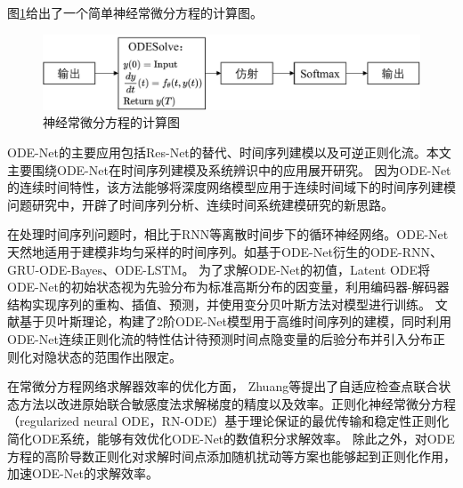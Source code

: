 图\ref{fig:neural_ode}给出了一个简单神经常微分方程的计算图。
\begin{figure}[h]
    \centering
    \includegraphics[width=0.9\linewidth]{figures/chapter1/simple_ode.pdf}
    \caption{神经常微分方程的计算图}
    \label{fig:neural_ode}
\end{figure}

ODE-Net的主要应用包括Res-Net的替代、时间序列建模以及可逆正则化流\cite{Grathwohl2019}。本文主要围绕ODE-Net在时间序列建模及系统辨识中的应用展开研究。
因为ODE-Net的连续时间特性，该方法能够将深度网络模型应用于连续时间域下的时间序列建模问题研究中，开辟了时间序列分析、连续时间系统建模研究的新思路。

在处理时间序列问题时，相比于RNN等离散时间步下的循环神经网络。ODE-Net天然地适用于建模非均匀采样的时间序列。如基于ODE-Net衍生的ODE-RNN\cite{10.5555/3454287.3454765}、GRU-ODE-Bayes\cite{brouwer2019gru}、ODE-LSTM\cite{lechner2020learning}。
为了求解ODE-Net的初值，Latent ODE\cite{10.5555/3454287.3454765}将ODE-Net的初始状态视为先验分布为标准高斯分布的因变量，利用编码器-解码器结构实现序列的重构、插值、预测，并使用变分贝叶斯方法对模型进行训练。
文献\cite{Yildiz2019}基于贝叶斯理论，构建了2阶ODE-Net模型用于高维时间序列的建模，同时利用ODE-Net连续正则化流的特性估计待预测时间点隐变量的后验分布并引入分布正则化对隐状态的范围作出限定。

在常微分方程网络求解器效率的优化方面，
Zhuang等\cite{Zhuang2020}提出了自适应检查点联合状态方法以改进原始联合敏感度法求解梯度的精度以及效率。正则化神经常微分方程（regularized neural ODE，RN-ODE）\cite{J2020}基于理论保证的最优传输和稳定性正则化简化ODE系统，能够有效优化ODE-Net的数值积分求解效率。
除此之外，对ODE方程的高阶导数正则化\cite{kelly2020}对求解时间点添加随机扰动\cite{Ghosh2020}等方案也能够起到正则化作用，加速ODE-Net的求解效率。


